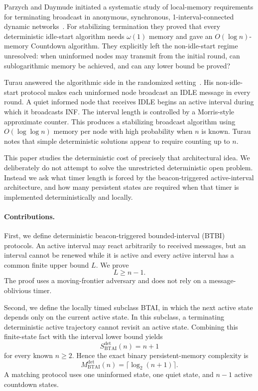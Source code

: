 \documentclass[11pt]{article}
\begin{document}
Parzych and Daymude initiated a systematic study of local-memory requirements for terminating broadcast in anonymous, synchronous, 1-interval-connected dynamic networks~\cite{parzych2024memory,parzych2026memory}. For stabilizing termination they proved that every deterministic idle-start algorithm needs $\omega(1)$ memory and gave an $O(\log n)$-memory Countdown algorithm. They explicitly left the non-idle-start regime unresolved: when uninformed nodes may transmit from the initial round, can sublogarithmic memory be achieved, and can any lower bound be proved?

Turau answered the algorithmic side in the randomized setting~\cite{turau2026broadcasts}. His non-idle-start protocol makes each uninformed node broadcast an IDLE message in every round. A quiet informed node that receives IDLE begins an active interval during which it broadcasts INF. The interval length is controlled by a Morris-style approximate counter. This produces a stabilizing broadcast algorithm using $O(\log\log n)$ memory per node with high probability when $n$ is known. Turau notes that simple deterministic solutions appear to require counting up to $n$.

This paper studies the deterministic cost of precisely that architectural idea. We deliberately do not attempt to solve the unrestricted deterministic open problem. Instead we ask what timer length is forced by the beacon-triggered active-interval architecture, and how many persistent states are required when that timer is implemented deterministically and locally.

\paragraph{Contributions.} First, we define deterministic beacon-triggered bounded-interval (BTBI) protocols. An active interval may react arbitrarily to received messages, but an interval cannot be renewed while it is active and every active interval has a common finite upper bound $L$. We prove
\[
L\ge n-1.
\]
The proof uses a moving-frontier adversary and does not rely on a message-oblivious timer.

Second, we define the locally timed subclass BTAI, in which the next active state depends only on the current active state. In this subclass, a terminating deterministic active trajectory cannot revisit an active state. Combining this finite-state fact with the interval lower bound yields
\[
S^{\mathrm{det}}_{\mathrm{BTAI}}(n)=n+1
\]
for every known $n\ge2$. Hence the exact binary persistent-memory complexity is
\[
M^{\mathrm{det}}_{\mathrm{BTAI}}(n)=\lceil\log_2(n+1)\rceil.
\]
A matching protocol uses one uninformed state, one quiet state, and $n-1$ active countdown states.
\end{document}
